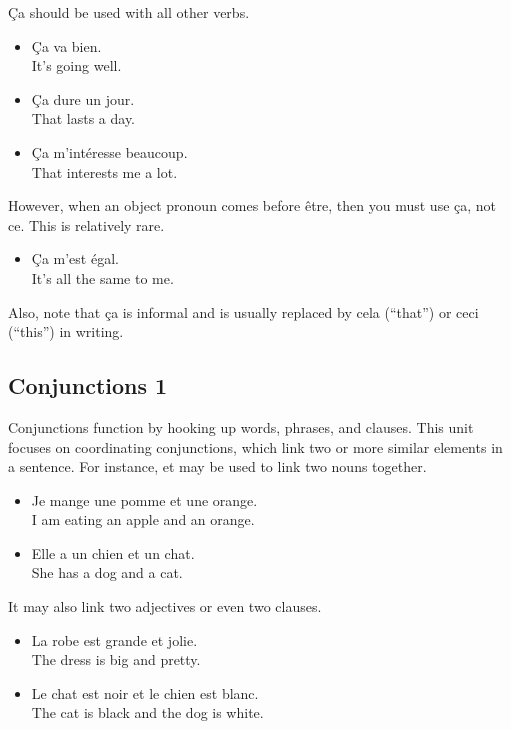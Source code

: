 {\c C}a should be used with all other verbs.

\begin{itemize}
  \item  {\c C}a va bien. \\ It's going well.
  \item  {\c C}a dure un jour. \\ That lasts a day.
  \item  {\c C}a m'intéresse beaucoup. \\ That interests me a lot.
\end{itemize}

However, when an object pronoun comes before {\^e}tre, then you must use {\c c}a, not ce. This is relatively rare.

\begin{itemize}
  \item  {\c C}a m'est {\'e}gal. \\ It's all the same to me.
\end{itemize}

Also, note that {\c c}a is informal and is usually replaced by cela (``that'') or ceci (``this'') in writing.


\pagebreak
\subsection{Conjunctions 1}

Conjunctions function by hooking up words, phrases, and clauses. This unit focuses on coordinating conjunctions, which link two or more similar elements in a sentence. For instance, \guillemotleft et \guillemotright may be used to link two nouns together.

\begin{itemize}
  \item  Je mange une pomme et une orange. \\ I am eating an apple and an orange.
  \item  Elle a un chien et un chat. \\ She has a dog and a cat.
\end{itemize}

It may also link two adjectives or even two clauses.

\begin{itemize}
  \item  La robe est grande et jolie. \\ The dress is big and pretty.
  \item  Le chat est noir et le chien est blanc. \\ The cat is black and the dog is white.
\end{itemize}

